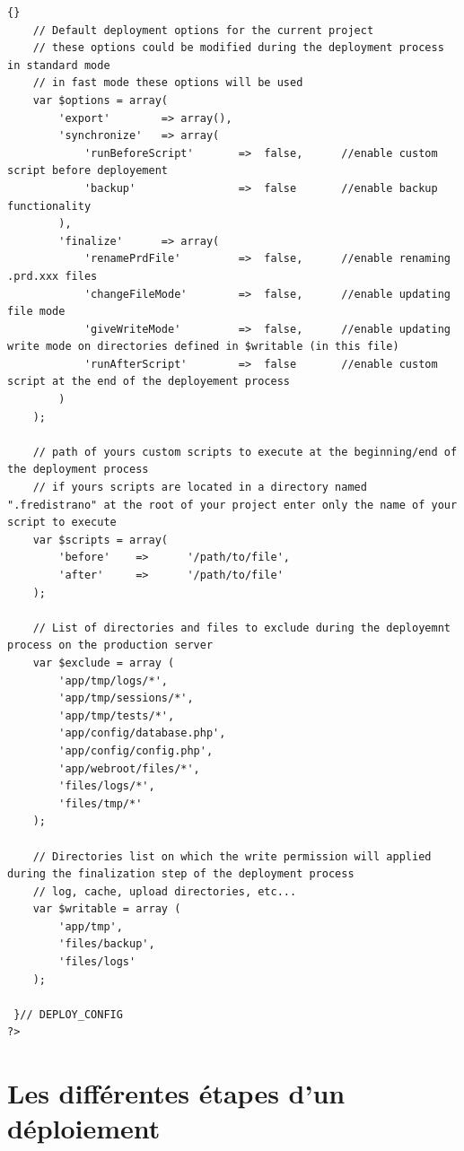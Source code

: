 \documentclass[12pt,a4paper]{report}
\begin{document}
\begin{itemize}
\begin{lstlisting}[frame=tb]{}
	// Default deployment options for the current project
	// these options could be modified during the deployment process in standard mode
	// in fast mode these options will be used
 	var $options = array(
 		'export' 		=> array(),
 		'synchronize'	=> array(
 		 	'runBeforeScript'		=> 	false, 		//enable custom script before deployement 
 			'backup'				=> 	false 		//enable backup functionality
 		),
 		'finalize'		=> array(
	 		'renamePrdFile' 		=> 	false,		//enable renaming .prd.xxx files
			'changeFileMode' 		=> 	false,		//enable updating file mode
			'giveWriteMode'			=> 	false,		//enable updating write mode on directories defined in $writable (in this file)
 			'runAfterScript'		=> 	false		//enable custom script at the end of the deployement process
 		)
 	);
 	
 	// path of yours custom scripts to execute at the beginning/end of the deployment process
	// if yours scripts are located in a directory named ".fredistrano" at the root of your project enter only the name of your script to execute
 	var $scripts = array(
 		'before' 	=>		'/path/to/file', 
 		'after' 	=>		'/path/to/file' 
 	);
 	
	// List of directories and files to exclude during the deployemnt process on the production server
	var $exclude = array (
		'app/tmp/logs/*',
		'app/tmp/sessions/*',
		'app/tmp/tests/*',
		'app/config/database.php',
		'app/config/config.php',
		'app/webroot/files/*',
		'files/logs/*',
		'files/tmp/*'
	);
		
	// Directories list on which the write permission will applied during the finalization step of the deployment process	
	// log, cache, upload directories, etc...
	var $writable = array (
		'app/tmp',
		'files/backup',
		'files/logs'
	);

 }// DEPLOY_CONFIG
?>
\end{lstlisting}

\end{itemize}
\newpage

\section{Les différentes étapes d'un déploiement }
\end{document}
